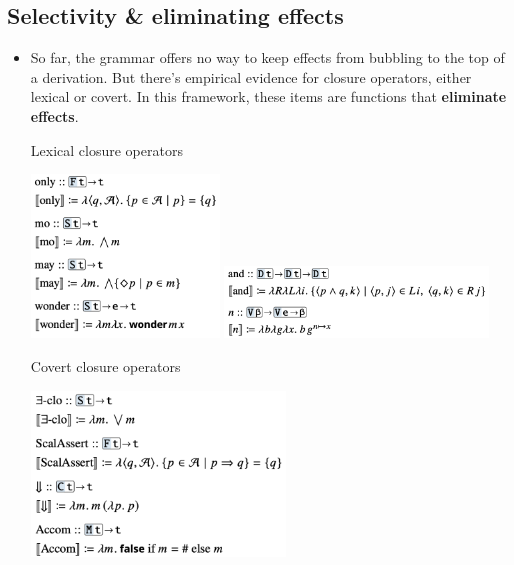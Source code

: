 \documentclass{article}
\begin{document}
\subsection{Selectivity \& eliminating effects}

\begin{itemize}
  \item So far, the grammar offers no way to keep effects from bubbling to the top of a derivation. But there's
  empirical evidence for closure operators, either lexical or covert. In this framework, these items are functions
  that \textbf{eliminate effects}.
  \begin{exe}
    \ex Lexical closure operators \hfill
      \begin{center}
        \includegraphics[width=5cm]{clips/35.png}
        \hfill
        \includegraphics[width=7cm]{clips/36.png}
      \end{center}
      \ex Covert closure operators \hfill
      \begin{center}
        \hspace{-195px}\includegraphics[width=6.75cm]{clips/37.png}
      \end{center}
  \end{exe}


\end{itemize}
\end{document}
